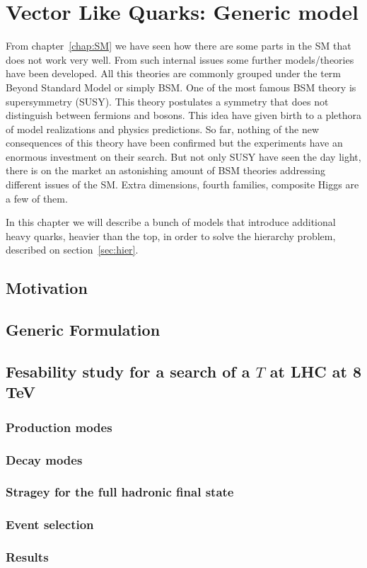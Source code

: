 \chapter[VLQ models]{Vector Like Quarks: Generic model}
\label{chap:VLQ}

From chapter~\ref{chap:SM} we have seen how there are some parts in the SM that does not work very well. From such internal issues some further models/theories have been developed. All this theories are commonly grouped under the term Beyond Standard Model or simply BSM. One of the most famous BSM theory is supersymmetry (SUSY). This theory postulates a symmetry that does not distinguish between fermions and bosons. This idea have given birth to a plethora of model realizations and physics predictions. So far, nothing of the new consequences of this theory have been confirmed but the experiments have an enormous investment on their search. But not only SUSY have seen the day light, there is on the market an astonishing amount of BSM theories addressing different issues of the SM. Extra dimensions, fourth families, composite Higgs are a few of them.

In this chapter we will describe a bunch of models that introduce additional heavy quarks, heavier than the top, in order to solve the hierarchy problem, described on section~\ref{sec:hier}. 

\section{Motivation}
\label{sec:motiv}

\section{Generic Formulation}
\label{sec:form}

\section{Fesability study for a search of a $T$ at LHC at 8 TeV}
\label{sec:pheno}

\subsection{Production modes}
\label{sec:prod}

\subsection{Decay modes}
\label{sec:decay}

\subsection{Stragey for the full hadronic final state}
\label{sec:Pstra}

\subsection{Event selection}
\label{sec:Psel}

\subsection{Results}
\label{sec:Pres}

